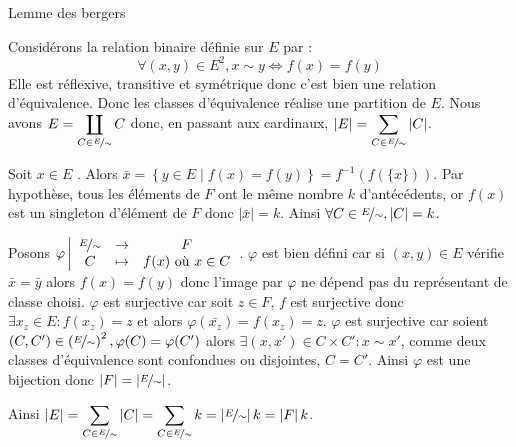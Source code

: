 \documentclass{article}
\begin{document}
	\begin{question_kholle}
		[Soient $E, F$ deux ensembles finis non vides et $f : E \rightarrow F$ telle que tout élément de $F$ possède le même nombre $k \in \N^*$ d'antécédents par $f$. \\
		Alors $\left|F\right| = \frac{\left|E\right|}{k}$
		\begin{quotation}
			\textquotedblleft Pour compter les moutons, il faut compter les pattes puis diviser par quatre. \textquotedblright
		\end{quotation}]
		{Lemme des bergers}

		Considérons la relation binaire définie sur $E$ par :
		\begin{equation*}
			\forall (x, y) \in E^2, x \sim y
			\iff f(x) = f(y)
		\end{equation*}
		Elle est réflexive, transitive et symétrique donc c'est bien une relation d'équivalence.
		Donc les classes d'équivalence réalise une partition de $E$.
		Nous avons $\displaystyle E = \coprod_{C \in \nicefrac{E}{\sim}} C$ donc, en passant aux cardinaux, $\displaystyle \left|E\right| = \sum_{C \in \nicefrac{E}{\sim}} \left|C\right|$.

		Soit $x \in E$ \fq. Alors $\bar{x} = \left\{ y \in E \;|\; f(x) = f(y) \right\} = f^{-1}(f(\{x\}))$. Par hypothèse, tous les éléments de $F$ ont le même nombre $k$ d'antécédents, or $f({x})$ est un singleton d'élément de $F$ donc $\left|\bar{x}\right| = k$.
		Ainsi $\forall C \in \nicefrac{E}{\sim}, \left|C\right| = k$.

		Posons $\varphi \left|\begin{array}{ccc}
			\nicefrac{E}{\sim} & \rightarrow & F \\
			C & \mapsto & f(x) \text{ où } x \in C
		\end{array}\right.$.
		$\varphi$ est bien défini car si $(x, y) \in E$ vérifie $\bar{x} = \bar{y}$ alors $f(x) = f(y)$ donc l'image par $\varphi$ ne dépend pas du représentant de classe choisi.
		$\varphi$ est surjective car soit $z \in F$, $f$ est surjective donc $\exists x_z \in E : f(x_z) = z$ et alors $\varphi(\bar{x_z}) = f(x_z) = z$.
		$\varphi$ est surjective car soient $(C, C') \in \left( \nicefrac{E}{\sim} \right)^2, \varphi(C) = \varphi(C')$ alors $\exists (x, x') \in C \times C' : x \sim x'$, comme deux classes d'équivalence sont confondues ou disjointes, $C = C'$.
		Ainsi $\varphi$ est une bijection donc $\left|F\right| = \left|\nicefrac{E}{\sim}\right|$.

		Ainsi $\displaystyle \left|E\right| = \sum_{C \in \nicefrac{E}{\sim}} \left|C\right| = \sum_{C \in \nicefrac{E}{\sim}} k = \left| \nicefrac{E}{\sim} \right| k = \left|F\right| k$.
	\end{question_kholle}
\end{document}

